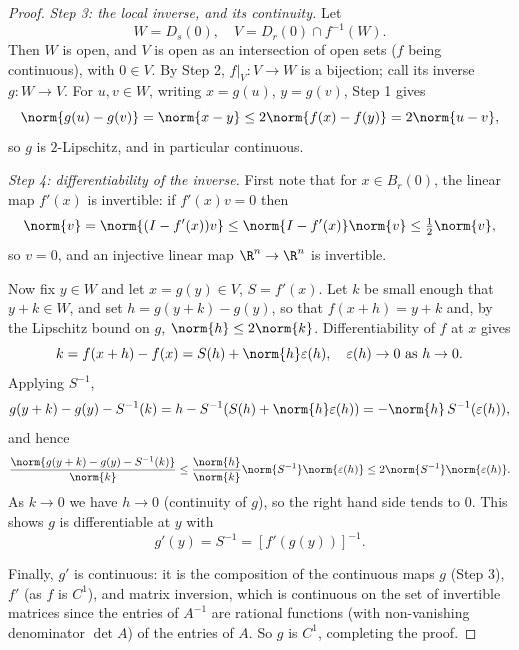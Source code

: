 \begin{proof}
    \emph{Step 3: the local inverse, and its continuity.} Let
    $$
    W = D_s(0), \quad V = D_r(0) \cap f^{-1}(W).
    $$
    Then $W$ is open, and $V$ is open as an intersection of open sets ($f$ being continuous), with $0 \in V$. By Step 2, $f|_V: V \rightarrow W$ is a bijection; call its inverse $g: W \rightarrow V$. For $u, v \in W$, writing $x = g(u)$, $y = g(v)$, Step 1 gives
    $$
    \norm{g(u) - g(v)} = \norm{x - y} \leq 2\norm{f(x) - f(y)} = 2\norm{u - v},
    $$
    so $g$ is $2$-Lipschitz, and in particular continuous.

    \emph{Step 4: differentiability of the inverse.} First note that for $x \in B_r(0)$, the linear map $f'(x)$ is invertible: if $f'(x)v = 0$ then
    $$
    \norm{v} = \norm{(I - f'(x))v} \leq \norm{I - f'(x)}\norm{v} \leq \tfrac{1}{2}\norm{v},
    $$
    so $v = 0$, and an injective linear map $\R^n \rightarrow \R^n$ is invertible.

    Now fix $y \in W$ and let $x = g(y) \in V$, $S = f'(x)$. Let $k$ be small enough that $y + k \in W$, and set $h = g(y + k) - g(y)$, so that $f(x + h) = y + k$ and, by the Lipschitz bound on $g$, $\norm{h} \leq 2\norm{k}$. Differentiability of $f$ at $x$ gives
    $$
    k = f(x + h) - f(x) = S(h) + \norm{h}\varepsilon(h), \quad \varepsilon(h) \rightarrow 0 \text{ as } h \rightarrow 0.
    $$
    Applying $S^{-1}$,
    $$
    g(y + k) - g(y) - S^{-1}(k) = h - S^{-1}(S(h) + \norm{h}\varepsilon(h)) = -\norm{h}\, S^{-1}(\varepsilon(h)),
    $$
    and hence
    $$
    \frac{\norm{g(y + k) - g(y) - S^{-1}(k)}}{\norm{k}} \leq \frac{\norm{h}}{\norm{k}}\norm{S^{-1}}\norm{\varepsilon(h)} \leq 2\norm{S^{-1}}\norm{\varepsilon(h)}.
    $$
    As $k \rightarrow 0$ we have $h \rightarrow 0$ (continuity of $g$), so the right hand side tends to $0$. This shows $g$ is differentiable at $y$ with
    $$
    g'(y) = S^{-1} = \left[f'(g(y))\right]^{-1}.
    $$

    Finally, $g'$ is continuous: it is the composition of the continuous maps $g$ (Step 3), $f'$ (as $f$ is $C^1$), and matrix inversion, which is continuous on the set of invertible matrices since the entries of $A^{-1}$ are rational functions (with non-vanishing denominator $\det A$) of the entries of $A$. So $g$ is $C^1$, completing the proof.
\end{proof}

